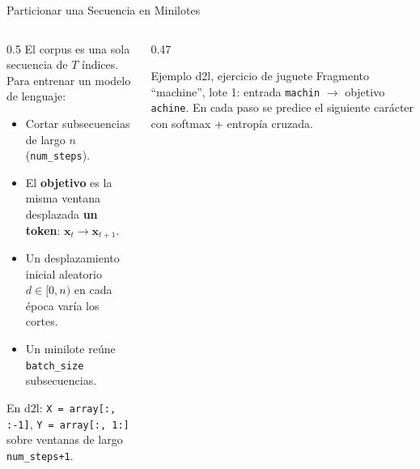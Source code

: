 \documentclass[aspectratio=169, 10pt]{beamer}
\begin{document}
\begin{frame}{Particionar una Secuencia en Minilotes}

	\begin{columns}[c]
		\begin{column}{0.5\textwidth}
			\small
			El corpus es una sola secuencia de $T$ \'indices. Para entrenar un modelo de lenguaje:
			\begin{itemize}
				\item Cortar subsecuencias de largo $n$ (\texttt{num\_steps}).
				\item El \textbf{objetivo} es la misma ventana desplazada \textbf{un token}: $\mathbf{x}_t \to \mathbf{x}_{t+1}$.
				\item Un desplazamiento inicial aleatorio $d \in [0, n)$ en cada \'epoca var\'ia los cortes.
				\item Un minilote re\'une \texttt{batch\_size} subsecuencias.
			\end{itemize}

			\vspace{0.1cm}
			{\scriptsize En d2l: \texttt{X = array[:, :-1]}, \texttt{Y = array[:, 1:]} sobre ventanas de largo \texttt{num\_steps+1}.}
		\end{column}

		\begin{column}{0.47\textwidth}
			\centering

			\vspace{0.4cm}

			\begin{block}{Ejemplo d2l, ejercicio de juguete}
				\scriptsize
				Fragmento ``machine'', lote 1: entrada \texttt{machin} $\to$ objetivo \texttt{achine}. En cada paso se predice el siguiente car\'acter con softmax + entrop\'ia cruzada.
			\end{block}
		\end{column}
	\end{columns}

\end{frame}
\end{document}
